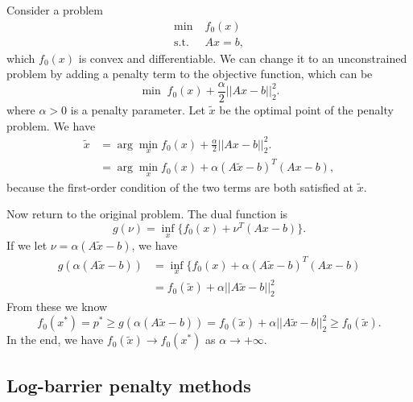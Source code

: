 \documentclass[lang=en,color=blue,mode=fancy,titlestyle=hang]{elegantbook}
\begin{document}
Consider a problem
\begin{align*}
\min \; &f_0(x)\\
\text{s.t.} \; &Ax = b,
\end{align*}
which $f_0(x)$ is convex and differentiable. We can change it to an unconstrained problem by adding a
penalty term to the objective function, which can be
\[
\min \; f_0(x) + \frac{\alpha}{2} ||Ax - b||_2^2.
\]
where $\alpha > 0$ is a penalty parameter. Let $\tilde{x}$ be the optimal point of the penalty problem.
We have
\begin{align*}
\tilde{x} &= \arg \min_x f_0(x) + \frac{\alpha}{2} ||Ax - b||_2^2.\\
&= \arg \min_x f_0(x) + \alpha (A \tilde{x} - b)^T (Ax - b),
\end{align*}
because the first-order condition of the two terms are both satisfied at $\tilde{x}$.

Now return to the original problem. The dual function is
\[
g(\nu) = \inf_x \{f_0(x) + \nu^T (Ax - b)\}.
\]
If we let $\nu = \alpha (A \tilde{x} - b)$, we have
\begin{align*}
g(\alpha (A \tilde{x} - b)) &= \inf_x \{f_0(x) + \alpha (A \tilde{x} - b)^T (Ax - b)\\
&= f_0(\tilde{x}) + \alpha||A \tilde{x} - b||_2^2
\end{align*}
From these we know
\[
f_0(x^*) = p^* \geq g(\alpha (A \tilde{x} - b)) = f_0(\tilde{x}) + \alpha||A \tilde{x} - b||_2^2 \geq f_0(\tilde{x}).
\]
In the end, we have $f_0(\tilde{x}) \to f_0(x^*)$ as $\alpha \to + \infty$.

\subsection{Log-barrier penalty methods}
\end{document}
